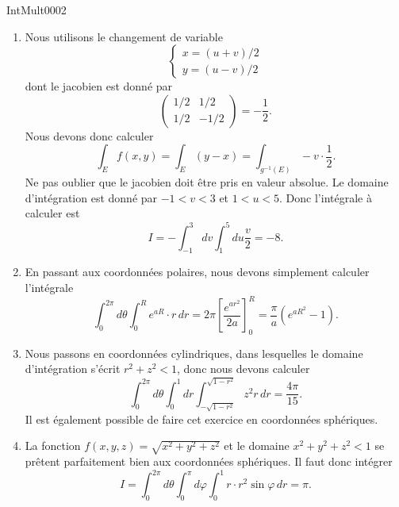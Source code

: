 
\begin{corrige}{IntMult0002}

\begin{enumerate}

\item
Nous utilisons le changement de variable
\begin{equation}
	\left\{
\begin{array}{ll}
x=(u+v)/2\\
y=(u-v)/2
\end{array}
\right.
\end{equation}
dont le jacobien est donné par
\begin{equation}
\begin{pmatrix}
	1/2	&	1/2	\\ 
	1/2	&	-1/2	
\end{pmatrix}=-\frac{ 1 }{2}.
\end{equation}
Nous devons donc calculer
\begin{equation}
	\int_Ef(x,y)=\int_E(y-x)=\int_{g^{-1}(E)}-v\cdot\frac{ 1 }{2}.
\end{equation}
Ne pas oublier que le jacobien doit être pris en valeur absolue. Le domaine d'intégration est donné par $-1<v<3$ et $1<u<5$. Donc l'intégrale à calculer est
\begin{equation}
	I=-\int_{-1}^3dv\int_1^5du\frac{ v }{ 2 }=-8.
\end{equation}

\item
En passant aux coordonnées polaires, nous devons simplement calculer l'intégrale
\begin{equation}
	\int_0^{2\pi}d\theta\int_0^R e^{aR}\cdot r\,dr=2\pi\left[ \frac{  e^{ar^2} }{ 2a } \right]_0^R=\frac{ \pi }{ a }( e^{aR^2}-1).
\end{equation}

\item
Nous passons en coordonnées cylindriques, dans lesquelles le domaine d'intégration s'écrit $r^2+z^2<1$, donc nous devons calculer
\begin{equation}
	\int_0^{2\pi}d\theta\int_0^1dr\int_{-\sqrt{1-r^2}}^{\sqrt{1-r^2}}z^2r\,dr=\frac{ 4\pi }{ 15 }.
\end{equation}
Il est également possible de faire cet exercice en coordonnées sphériques.

\item
La fonction $f(x,y,z)=\sqrt{x^2+y^2+z^2}$ et le domaine $x^2+y^2+z^2<1$ se prêtent parfaitement bien aux coordonnées sphériques. Il faut donc intégrer
\begin{equation}
	I=\int_0^{2\pi}d\theta\int_0^{\pi}d\varphi\int_0^1r\cdot r^2\sin\varphi\,dr=\pi.
\end{equation}


\end{enumerate}
\end{corrige}
